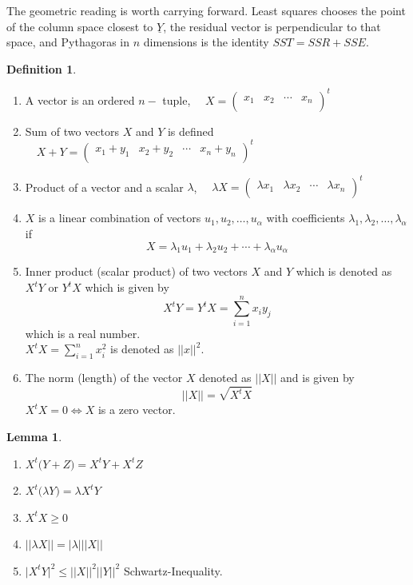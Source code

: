 \documentclass[11pt,a4paper]{article}
\theoremstyle{definition}
\newtheorem{defn}[thm]{Definition}
\newtheorem{lem}[thm]{Lemma}
\begin{document}
The geometric reading is worth carrying forward. Least squares chooses the
point of the column space closest to $\underline{Y}$, the residual vector is
perpendicular to that space, and Pythagoras in $n$ dimensions is the identity
$SST=SSR+SSE$.



\begin{defn}\label{res:defn:2.2.1}
\begin{enumerate}
\item[i).] A vector is an ordered $n-$ tuple, $\quad  X=
\begin{pmatrix}
x_1 & x_2 & \cdots & x_n\\
\end{pmatrix}^t
$
\item[ii).] Sum of two vectors $X$ and $Y$ is defined $\quad  X+Y=
\begin{pmatrix}
x_1+y_1 & x_2+y_2 & \cdots & x_n+y_n\\
\end{pmatrix}^t
$
\item[iii).] Product of a vector and a  scalar $\lambda$, $\quad \lambda X=
\begin{pmatrix}
\lambda x_1 & \lambda x_2 & \cdots & \lambda x_n\\
\end{pmatrix}^t
$
\item[iv).] $X$ is a linear combination of vectors $u_1,u_2,\ldots ,u_{\alpha}$ with coefficients $\lambda_1,\lambda_2,\ldots ,\lambda_{\alpha}$ if $$X=\lambda_1 u_1 + \lambda_2u_2+\cdots + \lambda_{\alpha}u_{\alpha}$$
\item[v).] Inner product (scalar product) of two vectors $X$ and $Y$ which is denoted as $X^tY$ or $Y^tX$ which is given by $$X^tY=Y^tX=\sum^n_{i=1}x_iy_j$$ which is a real number.\\

$X^tX=\sum\limits^n_{i=1}x^2_i$ is denoted as $||x||^2.$
\item[vi).] The norm (length) of the vector $X$ denoted as $||X||$ and is given by $$||X||=\sqrt{X^tX}$$ $X^tX=0\iff X$ is a zero vector.\\
\end{enumerate}



\end{defn}

\begin{lem}\label{res:lem:2.2.2}
\begin{enumerate}
\item[i.] $X^t\big(Y+Z\big)=X^tY+X^tZ$
\item[ii.] $X^t\big(\lambda Y\big) = \lambda X^tY$
\item[iii.] $X^tX\geq 0$
\item[iv.] $||\lambda X||=|\lambda|||X||$
\item[v.] $\big|X^tY\big|^2\leq ||X||^2||Y||^2$ Schwartz-Inequality.\\
\end{enumerate}
\end{lem}
\end{document}
